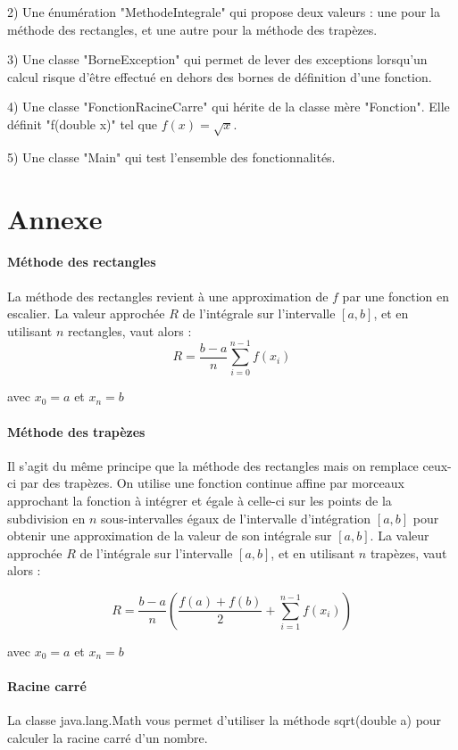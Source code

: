 \documentclass[a4paper,11pt]{article}
\begin{document}
2) Une énumération "MethodeIntegrale" qui propose deux valeurs : une pour la méthode des rectangles, et une autre pour la méthode des trapèzes.

3) Une classe "BorneException" qui permet de lever des exceptions lorsqu'un calcul risque d'être effectué en dehors des bornes de définition d'une fonction.
  
4) Une classe "FonctionRacineCarre" qui hérite de la classe mère "Fonction". Elle définit "f(double x)" tel que $f(x) = \sqrt{x}$.

5) Une classe "Main" qui test l'ensemble des fonctionnalités.

\section*{Annexe}

\paragraph{Méthode des rectangles}
La méthode des rectangles revient à une approximation de $f$ par une fonction en escalier. La valeur approchée $R$ de l'intégrale sur l'intervalle $[a,b]$, et en utilisant $n$ rectangles, vaut alors :
$$R = \frac{b - a}{n} \sum_{i = 0}^{n - 1} f(x_i)$$

avec $x_0 = a$ et $x_{n} = b$

\paragraph{Méthode des trapèzes}
Il s'agit du même principe que la méthode des rectangles mais on remplace ceux-ci par des trapèzes.
On utilise une fonction continue affine par morceaux approchant la fonction à intégrer et égale à celle-ci sur les points de la subdivision en $n$ sous-intervalles égaux de l'intervalle d'intégration $[a,b]$ pour obtenir une approximation de la valeur de son intégrale sur $[a,b]$. La valeur approchée $R$ de l'intégrale sur l'intervalle $[a,b]$, et en utilisant $n$ trapèzes, vaut alors :

$$R = \frac{b - a}{n} \left( \frac{f(a)+f(b)}{2} + \sum_{i=1}^{n-1} f(x_i) \right)$$

avec $x_0 = a$ et $x_{n} = b$

\paragraph{Racine carré}
La classe java.lang.Math vous permet d'utiliser la méthode sqrt(double a) pour calculer la racine carré d'un nombre.
\end{document}
